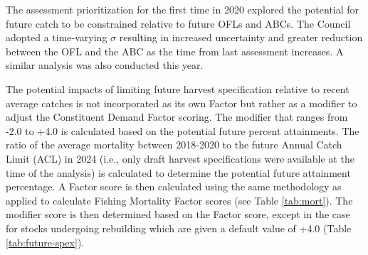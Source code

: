 \documentclass[11pt,
  english,
  a4paper,
]{article}
\begin{document}
\leavevmode\tagmcend\tagstructend


The assessment prioritization for the first time in 2020 explored the potential for future catch to be constrained relative to future OFLs and ABCs. The Council adopted a time-varying {\(\sigma\)\leavevmode\tagmcend\tagstructend} resulting in increased uncertainty and greater reduction between the OFL and the ABC as the time from last assessment increases. A similar analysis was also conducted this year.

\leavevmode\tagmcend\tagstructend\par


The potential impacts of limiting future harvest specification relative to recent average catches is not incorporated as its own Factor but rather as a modifier to adjust the Constituent Demand Factor scoring. The modifier that ranges from -2.0 to +4.0 is calculated based on the potential future percent attainments. The ratio of the average mortality between 2018-2020 to the future Annual Catch Limit (ACL) in 2024 (i.e., only draft harvest specifications were available at the time of the analysis) is calculated to determine the potential future attainment percentage. A Factor score is then calculated using the same methodology as applied to calculate Fishing Mortality Factor scores (see Table \ref{tab:mort}). The modifier score is then determined based on the Factor score, except in the case for stocks undergoing rebuilding which are given a default value of +4.0 (Table \ref{tab:future-spex}).

\leavevmode\tagmcend\tagstructend\par

\begingroup\fontsize{10}{12}\selectfont
\begingroup\fontsize{10}{12}\selectfont
\end{document}

